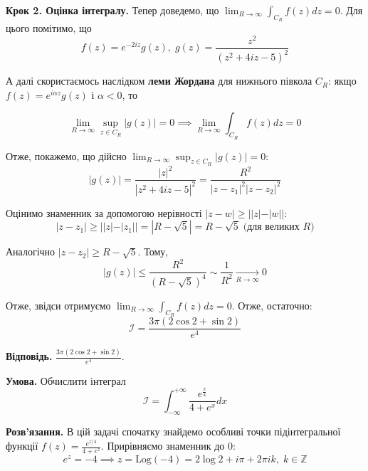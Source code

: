 \documentclass[oneside,solution]{karazin-complan-assign}
\begin{document}
\textbf{Крок 2. Оцінка інтегралу.} Тепер доведемо, що $\lim_{R \to \infty}\int_{C_R}f(z)dz=0$. Для цього помітимо, що
\begin{equation}
    f(z) = e^{-2iz}g(z), \; g(z) = \frac{z^2}{(z^2+4iz - 5)^2}
\end{equation}

А далі скористаємось наслідком \textbf{леми Жордана} для нижнього півкола $C_R$: якщо $f(z)=e^{i\alpha z}g(z)$ і $\alpha<0$, то

\begin{equation}
\lim_{R \to \infty} \sup_{z \in C_R} |g(z)| = 0 \implies \lim_{R \to \infty}\int_{C_R}f(z)dz = 0
\end{equation}

Отже, покажемо, що дійсно $\lim_{R \to \infty} \sup_{z \in C_R} |g(z)| = 0$:
\begin{equation}
    |g(z)| = \frac{|z|^2}{|z^2+4iz-5|^2} = \frac{R^2}{|z-z_1|^2|z-z_2|^2}
\end{equation}

Оцінимо знаменник за допомогою нерівності $|z - w| \geq ||z|-|w||$:
\begin{equation}
    |z-z_1| \geq ||z| - |z_1|| = |R - \sqrt{5}| = R - \sqrt{5} \; \text{(для великих $R$)}
\end{equation}

Аналогічно $|z-z_2| \geq R - \sqrt{5}$. Тому, 
\begin{equation}
    |g(z)| \leq \frac{R^2}{(R-\sqrt{5})^4} \sim \frac{1}{R^2} \xrightarrow[R \to \infty]{} 0
\end{equation}

Отже, звідси отримуємо $\lim_{R \to \infty}\int_{C_R}f(z)dz=0$. Отже, остаточно:
\begin{equation}
    \boxed{\mathcal{I} = \frac{3\pi(2\cos 2 + \sin 2)}{e^4}}
\end{equation}

\textbf{Відповідь.} $\frac{3\pi(2\cos 2 + \sin 2)}{e^4}$. 

\problem{}

\textbf{Умова.} Обчислити інтеграл
\begin{equation*}
    \mathcal{I} = \int_{-\infty}^{+\infty} \frac{e^{\frac{x}{4}}}{4+e^x}dx
\end{equation*}

\textbf{Розв'язання.} В цій задачі спочатку знайдемо особливі точки підінтегральної функції $f(z) = \frac{e^{z/4}}{4+e^z}$. Прирівняємо знаменник до $0$:
\begin{equation}
    e^z = -4 \implies z = \text{Log}(-4) = 2 \log 2 + i\pi + 2\pi i k, \; k \in \mathbb{Z}
\end{equation}
\end{document}
